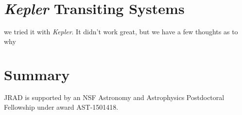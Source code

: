 \documentclass[preprint2]{aastex61}
\newcommand{\Kepler}{\textsl{Kepler}\xspace}
\begin{document}
\section{\Kepler Transiting Systems}
we tried it with \Kepler. It didn't work great, but we have a few thoughts as to why




\section{Summary}
\label{sec:summary}


\acknowledgments

JRAD is supported by an NSF Astronomy and Astrophysics Postdoctoral Fellowship under award AST-1501418. 



\end{document}
